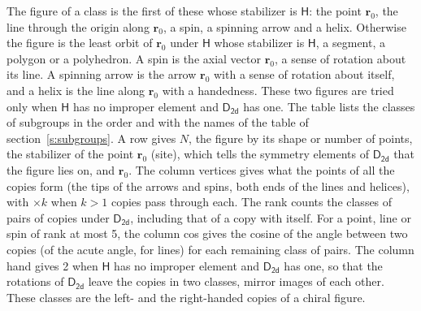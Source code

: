 \documentclass[10pt,a4paper]{article}
\numberwithin{equation}{section}
\newcommand{\grp}[1]{\mathsf{#1}}
\newcommand{\pointr}{\mathbf{r}}
\begin{document}
\leavevmode\label{n:head.figure}The figure of a class is the first of these whose stabilizer is $\grp{H}$: the point $\pointr_0$, the line through the origin along $\pointr_0$, a spin, a spinning arrow and a helix. Otherwise the figure is the least orbit of $\pointr_0$ under $\grp{H}$ whose stabilizer is $\grp{H}$, a segment, a polygon or a polyhedron. A spin is the axial vector $\pointr_0$, a sense of rotation about its line. A spinning arrow is the arrow $\pointr_0$ with a sense of rotation about itself, and a helix is the line along $\pointr_0$ with a handedness. These two figures are tried only when $\grp{H}$ has no improper element and $\grp{D_{2d}}$ has one. The table lists the classes of subgroups in the order and with the names of the table of section~\ref{s:subgroups}. \label{n:head.site}A row gives $N$, the figure by its shape or number of points, the stabilizer of the point $\pointr_0$ (site), which tells the symmetry elements of $\grp{D_{2d}}$ that the figure lies on, and $\pointr_0$. \label{n:head.vertices}The column vertices gives what the points of all the copies form (the tips of the arrows and spins, both ends of the lines and helices), with ${\times}k$ when $k > 1$ copies pass through each. \label{n:head.rank}The rank counts the classes of pairs of copies under $\grp{D_{2d}}$, including that of a copy with itself. \label{n:head.cos}For a point, line or spin of rank at most 5, the column cos gives the cosine of the angle between two copies (of the acute angle, for lines) for each remaining class of pairs. \label{n:head.hand}The column hand gives 2 when $\grp{H}$ has no improper element and $\grp{D_{2d}}$ has one, so that the rotations of $\grp{D_{2d}}$ leave the copies in two classes, mirror images of each other. These classes are the left- and the right-handed copies of a chiral figure.
\end{document}
